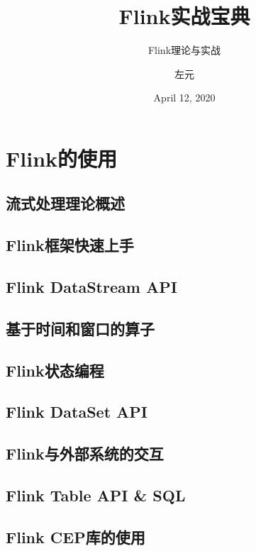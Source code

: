 \documentclass[cn,11pt,chinese]{elegantbook}
\title{Flink实战宝典}
\subtitle{Flink理论与实战}
\author{左元}
\institute{尚硅谷}
\date{April 12, 2020}
\begin{document}

\maketitle
\frontmatter

\tableofcontents

\mainmatter
\part{Flink的使用}

\chapter{流式处理理论概述}

\chapter{Flink框架快速上手}

\chapter{Flink DataStream API}

\chapter{基于时间和窗口的算子}

\chapter{Flink状态编程}

\chapter{Flink DataSet API}

\chapter{Flink与外部系统的交互}

\chapter{Flink Table API \& SQL}

\chapter{Flink CEP库的使用}
\end{document}
